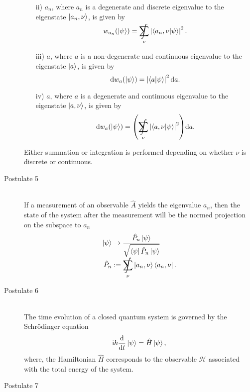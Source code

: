 \begin{description}
\begin{itemize}
					\item[ii)] $a_n$, where $a_n$ is a degenerate and discrete eigenvalue to the eigenstate $\Ket{a_n,\nu}$, is given by
					\begin{equation}
						w_{a_n}(\Ket{\psi}) = \SumInt_\nu \left|\braket{a_n ,\nu|\psi}\right|^2.
					\end{equation}
					\item[iii)] $a$, where $a$ is a non-degenerate and continuous eigenvalue to the eigenstate $\Ket{a}$, is given by
					\begin{equation}
						\dd w_a(\Ket{\psi}) = \left| \braket{a|\psi} \right|^2 \dd a.
					\end{equation}
					\item[iv)] $a$, where $a$ is a degenerate and continuous eigenvalue to the eigenstate $\Ket{a, \nu}$, is given by
					\begin{equation}
						\dd w_a(\Ket{\psi}) = \qty( \SumInt_\nu \abs{\braket{a,\nu |\psi} }^2 ) \dd a.
					\end{equation}
				\end{itemize}
				Either summation or integration is performed depending on whether $\nu$ is discrete or continuous.
			\item[Postulate 5]\hfill \\
				If a measurement of an observable $\hat{A}$ yields the eigenvalue $a_n$, then the state of the system after the measurement will be the normed projection on the subspace to $a_n$
				\begin{equation}
					\begin{aligned}
						\Ket{\psi} &\rightarrow \frac{\hat{P}_n\Ket{\psi}} {\sqrt{\Bra{\psi}\hat{P}_n\Ket{\psi}}} \\
						\hat{P}_n &:= \SumInt_\nu \Ket{a_n,\nu}\Bra{a_n,\nu}. \\
					\end{aligned}
				\end{equation}
			\item[Postulate 6]\hfill \\
				The time evolution of a closed quantum system is governed by the Schrödinger equation
				\begin{equation}
					\mathrm{i}\hbar\dv{t}\Ket{\psi} = \hat{H}\Ket{\psi},
				\end{equation}
				where, the Hamiltonian $\hat{H}$ corresponds to the observable $\mathcal{H}$ associated with the total energy of the system.
			\item[Postulate 7]\hfill \\

\end{description}
